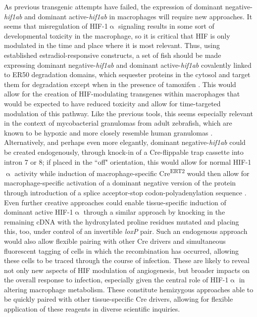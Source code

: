 As previous transgenic attempts have failed, the expression of dominant negative\hyp{}\textit{hif1ab} and dominant active\hyp{}\textit{hif1ab} in macrophages will require new approaches. It seems that misregulation of HIF\hyp{}1$\upalpha$ signaling results in some sort of developmental toxicity in the macrophage, so it is critical that HIF is only modulated in the time and place where it is most relevant. Thus, using established estradiol\hyp{}responsive constructs, a set of fish should be made expressing dominant negative\hyp{}\textit{hif1ab} and dominant active\hyp{}\textit{hif1ab} covalently linked to ER50 degradation domains, which sequester proteins in the cytosol and target them for degradation except when in the presence of tamoxifen \citep{Miyazaki2012}. This would allow for the creation of HIF\hyp{}modulating transgenes within macrophages that would be expected to have reduced toxicity and allow for time\hyp{}targeted modulation of this pathway. Like the previous tools, this seems especially relevant in the context of mycobacterial granulomas from adult zebrafish, which are known to be hypoxic and more closely resemble human granulomas \citep{Rustad2009, Harper2012, Oehlers2015}. Alternatively, and perhaps even more elegantly, dominant negative\hyp{}\textit{hif1ab} could be created endogenously, through knock\hyp{}in of a Cre\hyp{}flippable trap cassette into intron 7 or 8; if placed in the ``off" orientation, this would allow for normal HIF\hyp{}1$\upalpha$ activity while induction of macrophage\hyp{}specific Cre\textsuperscript{ERT2} would then allow for macrophage\hyp{}specific activation of a dominant negative version of the protein through introduction of a splice acceptor\hyp{}stop codon\hyp{}polyadenylation sequence \citep{Ni2012}. Even further creative approaches could enable tissue\hyp{}specific induction of dominant active HIF\hyp{}1$\upalpha$ through a similar approach by knocking in the remaining cDNA with the hydroxylated proline residues mutated and placing this, too, under control of an invertible \textit{loxP} pair. Such an endogenous approach would also allow flexible pairing with other Cre drivers and simultaneous fluorescent tagging of cells in which the recombination has occurred, allowing these cells to be traced through the course of infection. These are likely to reveal not only new aspects of HIF modulation of angiogenesis, but broader impacts on the overall response to infection, especially given the central role of HIF\hyp{}1$\upalpha$ in altering macrophage metabolism. These constitute hemizygous approaches able to be quickly paired with other tissue\hyp{}specific Cre drivers, allowing for flexible application of these reagents in diverse scientific inquiries.

